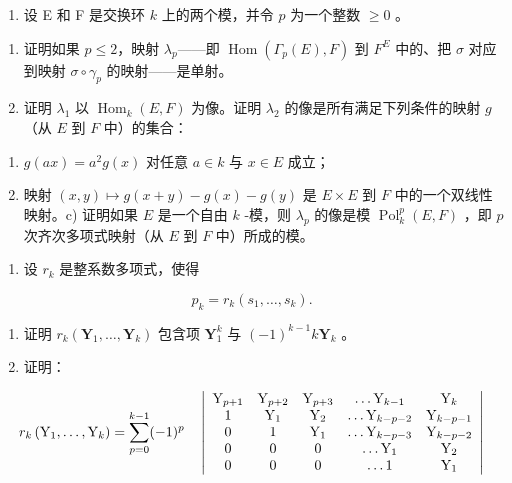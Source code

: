 \begin{enumerate}
\def\labelenumi{\arabic{enumi})}
\setcounter{enumi}{15}
\tightlist
\item
  设 E 和 F 是交换环 \(k\) 上的两个模，并令 \(p\) 为一个整数 \(\geqslant 0\) 。
\end{enumerate}

\begin{enumerate}
\def\labelenumi{\alph{enumi})}
\item
  证明如果 \(p \leqslant 2\)，映射 \(\lambda_p\)——即 \(\operatorname{Hom}(\Gamma_p(E), F)\) 到 \(F^E\) 中的、把 \(\sigma\) 对应到映射 \(\sigma \circ \gamma_p\) 的映射——是单射。
\item
  证明 \(\lambda_1\) 以 \(\operatorname{Hom}_k(E, F)\) 为像。证明 \(\lambda_2\) 的像是所有满足下列条件的映射 \(g\) （从 \(E\) 到 \(F\) 中）的集合：
\end{enumerate}

\begin{enumerate}
\def\labelenumi{(\roman{enumi})}
\item
  \(g(ax) = a^2 g(x)\) 对任意 \(a \in k\) 与 \(x \in E\) 成立；
\item
  映射 \((x, y) \mapsto g(x + y) - g(x) - g(y)\) 是 \(E \times E\) 到 \(F\) 中的一个双线性映射。c) 证明如果 \(E\) 是一个自由 \(k\) -模，则 \(\lambda_p\) 的像是模 \(\operatorname{Pol}_k^p(E, F)\) ，即 \(p\) 次齐次多项式映射（从 \(E\) 到 \(F\) 中）所成的模。
\end{enumerate}

\BourbakiExerciseGroup

\begin{enumerate}
\def\labelenumi{\arabic{enumi})}
\tightlist
\item
  设 \(r_k\) 是整系数多项式，使得
\end{enumerate}

\[
p _ {k} = r _ {k} (s _ {1}, \dots , s _ {k}).
\]

\begin{enumerate}
\def\labelenumi{\alph{enumi})}
\item
  证明 \(r_k(\mathbf{Y}_1, \ldots, \mathbf{Y}_k)\) 包含项 \(\mathbf{Y}_1^k\) 与 \((-1)^{k-1} k\mathbf{Y}_k\) 。
\item
  证明：
\end{enumerate}

\[
r _ {k} \left(\mathrm{Y} _ {1}, \dots , \mathrm{Y} _ {k}\right) = \sum_ {p = 0} ^ {k - 1} (- 1) ^ {p} \quad \left| \begin{array}{c c c c c} \mathrm{Y} _ {p + 1} & \mathrm{Y} _ {p + 2} & \mathrm{Y} _ {p + 3} & \dots \mathrm{Y} _ {k - 1} & \mathrm{Y} _ {k} \\ 1 & \mathrm{Y} _ {1} & \mathrm{Y} _ {2} & \dots \mathrm{Y} _ {k - p - 2} & \mathrm{Y} _ {k - p - 1} \\ 0 & 1 & \mathrm{Y} _ {1} & \dots \mathrm{Y} _ {k - p - 3} & \mathrm{Y} _ {k - p - 2} \\ 0 & 0 & 0 & \dots \mathrm{Y} _ {1} & \mathrm{Y} _ {2} \\ 0 & 0 & 0 & \dots 1 & \mathrm{Y} _ {1} \end{array} \right|
\]

